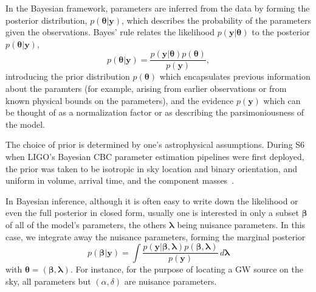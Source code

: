 \documentclass[amsmath,amssymb,aps,prx,reprint,nopreprintnumbers,nofootinbib,showpacs]{revtex4-1}
\begin{document}
In the Bayesian framework, parameters are inferred from the data by forming the posterior distribution, $p(\bm\theta|\mathbf y)$, which describes the probability of the parameters given the observations. Bayes' rule relates the likelihood $p(\mathbf y|\bm\theta)$ to the posterior $p(\bm\theta|\mathbf y)$,
%
\begin{equation}\label{bayes}
p(\bm\theta|\mathbf y) = \frac{p(\mathbf y|\bm\theta) p(\bm\theta)}{p(\mathbf y)},
\end{equation}
%
introducing the prior distribution $p(\bm\theta)$ which encapsulates previous information about the paramters (for example, arising from earlier observations or from known physical bounds on the parameters), and the evidence $p(\mathbf y)$ which can be thought of as a normalization factor or as describing the parsimoniousness of the model.

The choice of prior is determined by one's astrophysical assumptions. During \ac{S6} when LIGO's Bayesian \ac{CBC} parameter estimation pipelines were first deployed, the prior was taken to be isotropic in sky location and binary orientation, and uniform in volume, arrival time, and the component masses~\cite{S6PE}.

In Bayesian inference, although it is often easy to write down the likelihood or even the full posterior in closed form, usually one is interested in only a subset $\bm\beta$ of all of the model's parameters, the others $\bm\lambda$ being nuisance parameters. In this case, we integrate away the nuisance parameters, forming the marginal posterior
%
\begin{equation}\label{eq:marginal-posterior}
    p(\bm\beta|\mathbf y) = \int \frac{p(\mathbf y|\bm\beta,\bm\lambda) p(\bm\beta,\bm\lambda)}{p(\mathbf y)} \,d\bm\lambda
\end{equation}
%
with $\bm\theta = (\bm\beta, \bm\lambda)$. For instance, for the purpose of locating a \ac{GW} source on the sky, all parameters but $(\alpha, \delta)$ are nuisance parameters.

\end{document}
